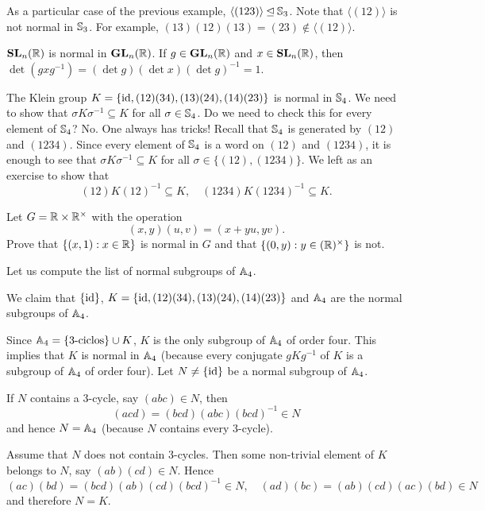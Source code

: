 \begin{example}
As a particular case of the previous example, 
$\langle (123)\rangle\unlhd\mathbb{S}_3$. Note that
$\langle (12)\rangle$ is not normal in $\mathbb{S}_3$.  
For example, $(13)(12)(13)=(23)\not\in\langle(12)\rangle$.
\end{example}

\begin{example}
$\mathbf{SL}_n(\mathbb{R})$ is normal in $\mathbf{GL}_n(\mathbb{R})$. If $g\in\mathbf{GL}_n(\mathbb{R})$ and $x\in\mathbf{SL}_n(\mathbb{R})$, then $\det(gxg^{-1})=(\det g)(\det x)(\det g)^{-1}=1$.
\end{example}

\begin{example}
The Klein group $K=\{\operatorname{id},(12)(34),(13)(24),(14)(23)\}$ is normal in
$\mathbb{S}_4$. We need to show that 
$\sigma K\sigma^{-1}\subseteq K$ for all $\sigma\in\mathbb{S}_4$. Do we need to check this for every element of $\mathbb{S}_4$? No. One always has tricks! 
Recall that $\mathbb{S}_4$ is generated by $(12)$ and $(1234)$. Since
every element of  $\mathbb{S}_4$ is a word on $(12)$ and 
$(1234)$,
it is enough to see that
$\sigma K\sigma^{-1}\subseteq K$ for all $\sigma\in\{(12),(1234)\}$. We left as an exercise to show that 
\[
(12)K(12)^{-1}\subseteq K,\quad
(1234)K(1234)^{-1}\subseteq K.
\]
\end{example}

\begin{exercise}
Let $G=\mathbb{R}\times\mathbb{R}^\times$ with the operation 
\[
(x,y)(u,v)=(x+yu,yv).
\]
Prove that $\{(x,1):x\in\mathbb{R}\}$ is normal in $G$ and that
$\{(0,y):y\in(\mathbb{R})^\times\}$ is not. 
\end{exercise}

Let us compute the list of normal subgroups of $\mathbb{A}_4$.

\begin{example}
We claim that 
$\{\operatorname{id}\}$, $K=\{\operatorname{id},(12)(34),(13)(24),(14)(23)\}$ and $\mathbb{A}_4$ 
are the normal subgroups of $\mathbb{A}_4$.

Since $\mathbb{A}_4=\{\text{3-ciclos}\}\cup K$, $K$ is the only subgroup
of $\mathbb{A}_4$ of order four. This implies that $K$ is normal in $\mathbb{A}_4$ (because every conjugate $gKg^{-1}$ of $K$ is a subgroup of 
$\mathbb{A}_4$ of order four). Let $N\ne\{\operatorname{id}\}$ be a normal subgroup of 
$\mathbb{A}_4$. 

If $N$ contains a 3-cycle, say 
$(abc)\in N$, then 
\[
(acd)=(bcd)(abc)(bcd)^{-1}\in N
\]
and hence $N=\mathbb{A}_4$ (because $N$ contains every 3-cycle). 

Assume that $N$ does not contain 3-cycles. 
Then some non-trivial element of $K$ belongs to $N$, say 
$(ab)(cd)\in N$. Hence 
\[
(ac)(bd)=(bcd)(ab)(cd)(bcd)^{-1}\in N,\quad
(ad)(bc)=(ab)(cd)(ac)(bd)\in N
\]
and therefore $N=K$.
\end{example}

